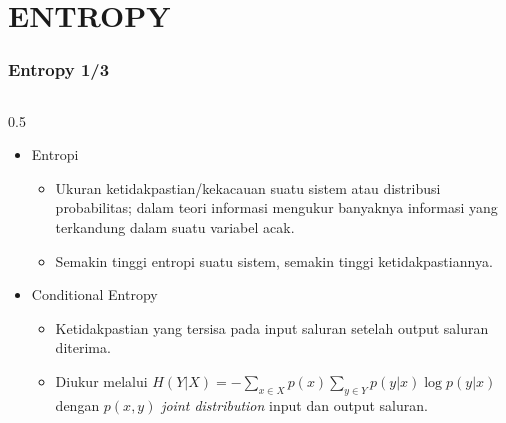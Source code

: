 \section{ENTROPY}

\begin{frame}
    \frametitle{Entropy 1/3}
    \vspace*{-0.5cm}
    \begin{columns}[T]
        \small
        \begin{column}{0.5\textwidth}
            \begin{itemize}\tiny\justifying
                \item Entropi \cite{djordjevic2019physical}
                    \begin{itemize}
                        \item[$\Rightarrow$] Ukuran ketidakpastian/kekacauan suatu
                            sistem atau distribusi probabilitas; dalam teori
                            informasi mengukur banyaknya informasi yang
                            terkandung dalam suatu variabel acak.
                        \item[$\Rightarrow$] Semakin tinggi entropi suatu sistem,
                            semakin tinggi ketidakpastiannya.
                    \end{itemize}
                \item Conditional Entropy
                    \begin{itemize}
                        \item[$\Rightarrow$] Ketidakpastian yang tersisa pada input
                            saluran setelah output saluran diterima.
                        \item[$\Rightarrow$] Diukur melalui
                            $H(Y|X)=-\sum_{x\in X}p(x)\sum_{y\in Y}p(y|x)\log p(y|x)$
                            dengan $p(x,y)$ \textit{joint distribution} input
                            dan output saluran.
                    \end{itemize}
            \end{itemize}
        \end{column}


\end{columns}
\end{frame}

